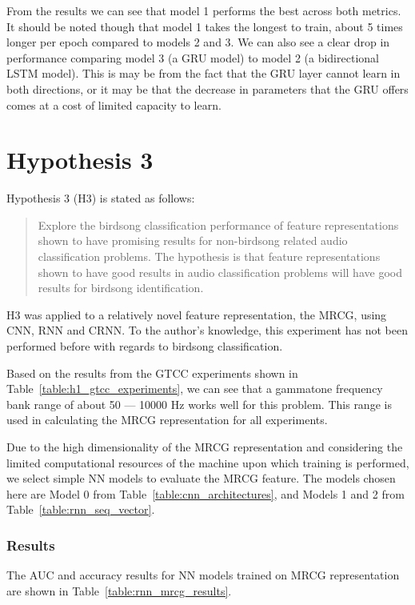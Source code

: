 From the results we can see that model 1 performs the best across both metrics.
It should be noted though that model 1 takes the longest to train, about 5 times
longer per epoch compared to models 2 and 3. We can also see a clear drop in
performance comparing model 3 (a GRU model) to model 2 (a bidirectional LSTM
model). This is may be from the fact that the GRU layer cannot learn in both
directions, or it may be that the decrease in parameters that the GRU offers
comes at a cost of limited capacity to learn.

\section{Hypothesis 3}

Hypothesis 3 (H3) is stated as follows:

\begin{quote}
Explore the birdsong classification performance of feature representations
\\shown to have promising results for non-birdsong related audio classification
problems. The hypothesis is that feature representations shown to have good
results in audio classification problems will have good results for birdsong
identification.
\end{quote}

H3 was applied to a relatively novel feature representation, the MRCG, using
CNN, RNN and CRNN\@. To the author's knowledge, this experiment has not been
performed before with regards to birdsong classification.

Based on the results from the GTCC experiments shown in
Table~\ref{table:h1_gtcc_experiments}, we can see that a gammatone frequency
bank range of about 50 --- 10000 Hz works well for this problem. This range is
used in calculating the MRCG representation for all experiments.

Due to the high dimensionality of the MRCG representation and considering the
limited computational resources of the machine upon which training is performed,
we select simple NN models to evaluate the MRCG feature. The models chosen here
are Model 0 from Table~\ref{table:cnn_architectures}, and Models 1 and 2 from
Table~\ref{table:rnn_seq_vector}.

\subsubsection{Results}

The AUC and accuracy results for NN models trained on MRCG representation are
shown in Table~\ref{table:rnn_mrcg_results}.


